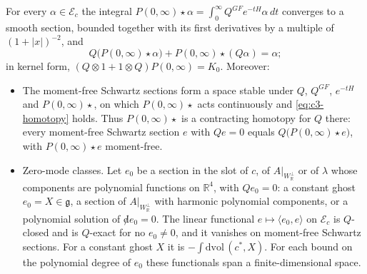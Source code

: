 \begin{theorem}
\label{thm:c3-acyclic}
For every $\alpha\in\mathscr E_c$ the integral $P(0,\infty)\star\alpha=\int_0^\infty Q^{GF}e^{-tH}\alpha\,dt$ converges to a smooth section, bounded together with its first derivatives by a multiple of $(1+|x|)^{-2}$, and
\begin{equation}
Q\big(P(0,\infty)\star\alpha\big)+P(0,\infty)\star(Q\alpha)=\alpha ;
\label{eq:c3-homotopy}
\end{equation}
in kernel form, $(Q\otimes1+1\otimes Q)P(0,\infty)=K_0$. Moreover:
\begin{itemize}
\item The moment-free Schwartz sections form a space stable under $Q$, $Q^{GF}$, $e^{-tH}$ and $P(0,\infty)\star$, on which $P(0,\infty)\star$ acts continuously and \eqref{eq:c3-homotopy} holds. Thus $P(0,\infty)\star$ is a contracting homotopy for $Q$ there: every moment-free Schwartz section $e$ with $Qe=0$ equals $Q\big(P(0,\infty)\star e\big)$, with $P(0,\infty)\star e$ moment-free.
\item Zero-mode classes. Let $e_0$ be a section in the slot of $c$, of $A|_{W_{\mathbb R}^\perp}$ or of $\lambda$ whose components are polynomial functions on $\mathbb R^4$, with $Qe_0=0$: a constant ghost $e_0=X\in\mathfrak g$, a section of $A|_{W_{\mathbb R}^\perp}$ with harmonic polynomial components, or a polynomial solution of ${\not d}e_0=0$. The linear functional $e\mapsto\langle e_0,e\rangle$ on $\mathscr E_c$ is $Q$-closed and is $Q$-exact for no $e_0\neq0$, and it vanishes on moment-free Schwartz sections. For a constant ghost $X$ it is $-\int\mathrm{dvol}\,(c^*,X)$. For each bound on the polynomial degree of $e_0$ these functionals span a finite-dimensional space.
\end{itemize}
\end{theorem}

